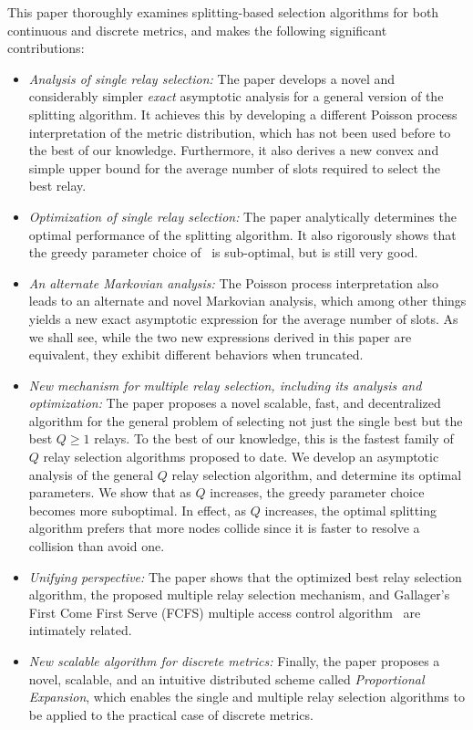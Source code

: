 \documentclass[12pt,draftcls,peerreview, onecolumn]{IEEEtran}
\begin{document}
This paper thoroughly examines splitting-based selection algorithms
for both continuous and discrete metrics, and makes the following
significant contributions:
\begin{itemize}
  
\item {\em Analysis of single relay selection:} The paper develops a
  novel and considerably simpler {\em exact} asymptotic analysis for a
  general version of the splitting algorithm.  It achieves this by
  developing a different Poisson process interpretation of the metric
  distribution, which has not been used before to the best of our
  knowledge. Furthermore, it also derives a new convex and simple
  upper bound for the average number of slots required to select the
  best relay.

\item {\em Optimization of single relay selection:} The paper
  analytically determines the optimal performance of the splitting
  algorithm. It also rigorously shows that the greedy parameter choice
  of~\cite{qin_infocomm_2004} is sub-optimal, but is still very good.
  
\item {\em An alternate Markovian analysis:} The Poisson process
  interpretation also leads to an alternate and novel Markovian
  analysis, which among other things yields a new exact asymptotic
  expression for the average number of slots. As we shall see, while
  the two new expressions derived in this paper are equivalent, they
  exhibit different behaviors when truncated.
  
\item {\em New mechanism for multiple relay selection, including its
    analysis and optimization:} The paper proposes a novel scalable,
  fast, and decentralized algorithm for the general problem of
  selecting not just the single best but the best $Q\geq1$ relays. To
  the best of our knowledge, this is the fastest family of $Q$ relay
  selection algorithms proposed to date. We develop an asymptotic
  analysis of the general $Q$ relay selection algorithm, and determine
  its optimal parameters. We show that as $Q$ increases, the greedy
  parameter choice becomes more suboptimal. In effect, as $Q$
  increases, the optimal splitting algorithm prefers that more nodes
  collide since it is faster to resolve a collision than avoid one.

\item {\em Unifying perspective:} The paper shows that the optimized
  best relay selection algorithm, the proposed multiple relay
  selection mechanism, and Gallager's First Come First Serve (FCFS)
  multiple access control algorithm~\cite{bertsekas_gallager} are intimately
  related.
  
\item {\em New scalable algorithm for discrete metrics:} Finally, the
  paper proposes a novel, scalable, and an intuitive distributed
  scheme called {\em Proportional Expansion}, which enables the single
  and multiple relay selection algorithms to be applied to the
  practical case of discrete metrics.

\end{itemize}
\end{document}
